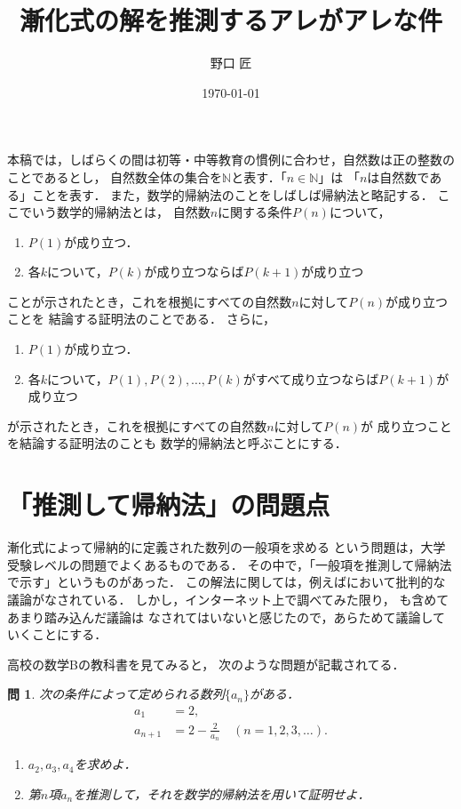 \documentclass[11pt,a4paper]{ltjsarticle} %
\title{漸化式の解を推測するアレがアレな件}
\author{野口 匠}
\date{\today}
\theoremstyle{mystyle} %
\newtheorem{que}{問} %
\begin{document}
%
\maketitle

本稿では，しばらくの間は初等・中等教育の慣例に合わせ，自然数は正の整数のことであるとし，
自然数全体の集合を$\mathbb{N}$と表す．「$n \in \mathbb{N}$」は
「$n$は自然数である」ことを表す．
また，数学的帰納法のことをしばしば帰納法と略記する．
ここでいう数学的帰納法とは，
自然数$n$に関する条件$P(n)$について，
\begin{enumerate}
  \item $P(1)$が成り立つ．
  \item 各$k$について，$P(k)$が成り立つならば$P(k+1)$が成り立つ
\end{enumerate}
ことが示されたとき，これを根拠にすべての自然数$n$に対して$P(n)$が成り立つことを
結論する証明法のことである．
さらに，
\begin{enumerate}
  \item $P(1)$が成り立つ．
  \item 各$k$について，$P(1),P(2),\ldots, P(k)$がすべて成り立つならば$P(k+1)$が成り立つ
\end{enumerate}
が示されたとき，これを根拠にすべての自然数$n$に対して$P(n)$が
成り立つことを結論する証明法のことも
数学的帰納法と呼ぶことにする．

%

\section{「推測して帰納法」の問題点}


漸化式によって帰納的に定義された数列の一般項を求める
という問題は，大学受験レベルの問題でよくあるものである．
その中で，「一般項を推測して帰納法で示す」というものがあった．
この解法に関しては，例えば\cite{izumi}において批判的な議論がなされている．
しかし，インターネット上で調べてみた限り，
\cite{izumi}も含めてあまり踏み込んだ議論は
なされてはいないと感じたので，あらためて議論していくことにする．


高校の数学Bの教科書\cite{kyoukasyo}を見てみると，
次のような問題が記載されてる．

\begin{que} \label{que:suisoku}
  次の条件によって定められる数列$\{ a_n \}$がある．
  \begin{align*}
    a_1 & = 2 , \\
    a_{n+1} & = 2- \frac{2}{a_n} \quad ( n = 1,2,3, \ldots).
  \end{align*}
  \begin{enumerate}
    \item $a_2,a_3,a_4$を求めよ．
    \item 第$n$項$a_n$を推測して，それを数学的帰納法を用いて証明せよ．
  \end{enumerate}
\end{que}
\end{document}
